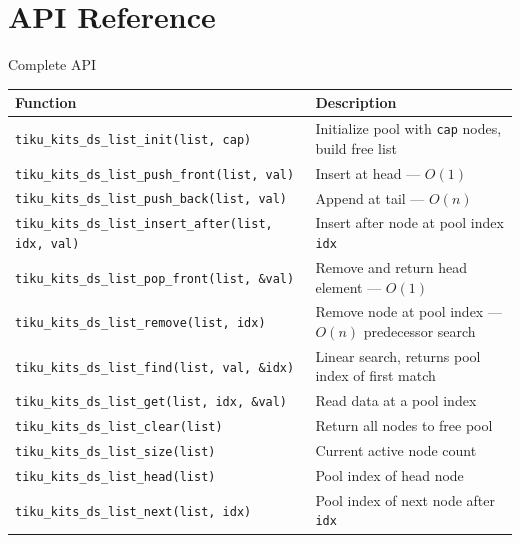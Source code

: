 \documentclass[aspectratio=169, 10pt]{beamer}
\begin{document}
\section{API Reference}

\begin{frame}[fragile]{Complete API}
\begin{table}
\centering
\small
\begin{tabular}{@{}lp{7.5cm}@{}}
\toprule
\textbf{Function} & \textbf{Description} \\
\midrule
\texttt{tiku\_kits\_ds\_list\_init(list, cap)}
  & Initialize pool with \texttt{cap} nodes, build free list \\
\midrule
\texttt{tiku\_kits\_ds\_list\_push\_front(list, val)}
  & Insert at head --- $O(1)$ \\
\texttt{tiku\_kits\_ds\_list\_push\_back(list, val)}
  & Append at tail --- $O(n)$ \\
\texttt{tiku\_kits\_ds\_list\_insert\_after(list, idx, val)}
  & Insert after node at pool index \texttt{idx} \\
\midrule
\texttt{tiku\_kits\_ds\_list\_pop\_front(list, \&val)}
  & Remove and return head element --- $O(1)$ \\
\texttt{tiku\_kits\_ds\_list\_remove(list, idx)}
  & Remove node at pool index --- $O(n)$ predecessor search \\
\midrule
\texttt{tiku\_kits\_ds\_list\_find(list, val, \&idx)}
  & Linear search, returns pool index of first match \\
\texttt{tiku\_kits\_ds\_list\_get(list, idx, \&val)}
  & Read data at a pool index \\
\midrule
\texttt{tiku\_kits\_ds\_list\_clear(list)}
  & Return all nodes to free pool \\
\texttt{tiku\_kits\_ds\_list\_size(list)}
  & Current active node count \\
\texttt{tiku\_kits\_ds\_list\_head(list)}
  & Pool index of head node \\
\texttt{tiku\_kits\_ds\_list\_next(list, idx)}
  & Pool index of next node after \texttt{idx} \\
\bottomrule
\end{tabular}
\end{table}
\end{frame}

\end{document}

